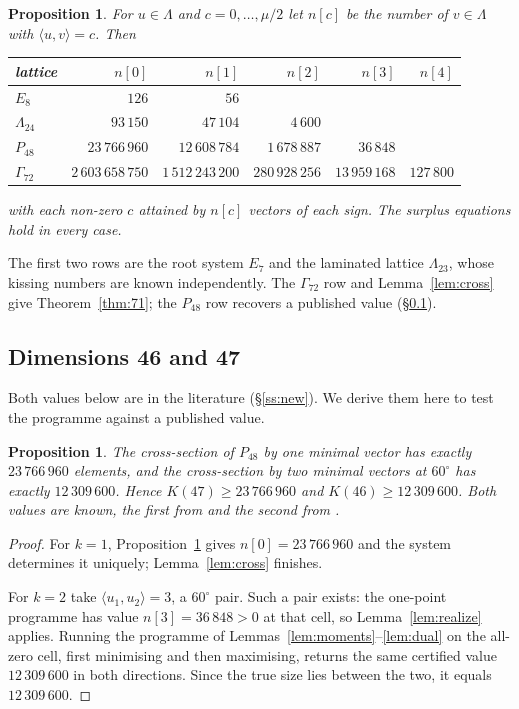 \documentclass[11pt]{amsart}
\newtheorem{proposition}[theorem]{Proposition}
\theoremstyle{remark}
\newcommand{\Leech}{\Lambda_{24}}
\newcommand{\Pff}{P_{48}}
\newcommand{\Gsz}{\Gamma_{72}}
\newcommand{\ip}[2]{\langle #1,#2\rangle}
\begin{document}
\begin{proposition}\label{prop:onepoint}
For $u\in\Lambda$ and $c=0,\dots,\mu/2$ let $n[c]$ be the number of $v\in\Lambda$
with $\ip{u}{v}=c$. Then
\begin{center}
\begin{tabular}{lrrrrr}
\toprule
lattice & $n[0]$ & $n[1]$ & $n[2]$ & $n[3]$ & $n[4]$\\
\midrule
$E_8$    & $126$ & $56$ & & & \\
$\Leech$ & $93\,150$ & $47\,104$ & $4\,600$ & & \\
$\Pff$   & $23\,766\,960$ & $12\,608\,784$ & $1\,678\,887$ & $36\,848$ & \\
$\Gsz$   & $2\,603\,658\,750$ & $1\,512\,243\,200$ & $280\,928\,256$ & $13\,959\,168$ & $127\,800$\\
\bottomrule
\end{tabular}
\end{center}
with each non-zero $c$ attained by $n[c]$ vectors of each sign. The surplus
equations hold in every case.
\end{proposition}

The first two rows are the root system $E_7$ and the laminated lattice
$\Lambda_{23}$, whose kissing numbers are known independently. The $\Gsz$ row and
Lemma~\ref{lem:cross} give Theorem~\ref{thm:71}; the $\Pff$ row recovers a
published value (\S\ref{ss:p48}).

\subsection{Dimensions 46 and 47}\label{ss:p48}

Both values below are in the literature (\S\ref{ss:new}). We derive them here to
test the programme against a published value.

\begin{proposition}\label{thm:47}
The cross-section of $\Pff$ by one minimal vector has exactly $23\,766\,960$
elements, and the cross-section by two minimal vectors at $60^\circ$ has exactly
$12\,309\,600$. Hence $K(47)\ge 23\,766\,960$ and $K(46)\ge 12\,309\,600$. Both
values are known, the first from \cite{boyvalenkov-cherkashin2025} and the second
from \cite{sun-wang2026}.
\end{proposition}

\begin{proof}
For $k=1$, Proposition~\ref{prop:onepoint} gives $n[0]=23\,766\,960$ and the
system determines it uniquely; Lemma~\ref{lem:cross} finishes.

For $k=2$ take $\ip{u_1}{u_2}=3$, a $60^\circ$ pair. Such a pair exists: the
one-point programme has value $n[3]=36\,848>0$ at that cell, so
Lemma~\ref{lem:realize} applies. Running the programme of Lemmas~\ref{lem:moments}--\ref{lem:dual} on
the all-zero cell, first minimising and then maximising, returns the same
certified value $12\,309\,600$ in both directions. Since the true size lies
between the two, it equals $12\,309\,600$.
\end{proof}
\end{document}
